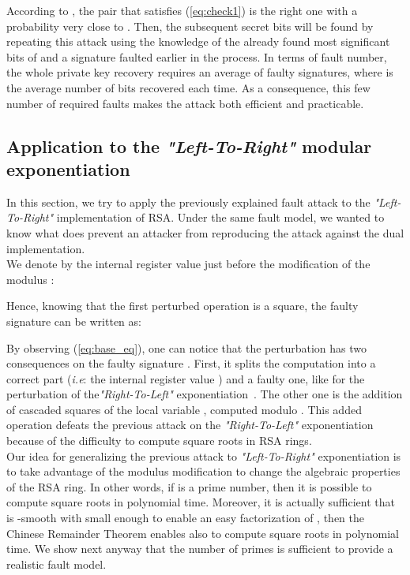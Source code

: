 \documentclass{article}
\begin{document}
According to \cite{77}, the pair  that satisfies (\ref{eq:check1}) is the right one with a probability very close to . Then, the subsequent secret bits will be found by repeating this attack using the knowledge of the already found most significant bits of  and a signature faulted earlier in the process. In terms of fault number, the whole private key recovery requires an average of  faulty signatures, where  is the average number of bits recovered each time. As a consequence, this few number of required faults makes the attack both efficient and practicable.

\subsection{Application to the \textit{"Left-To-Right"} modular exponentiation}
\label{sec:l2r_mod_exp}
In this section, we try to apply the previously explained fault attack to the \textit{"Left-To-Right"} implementation of RSA. Under the same fault model, we wanted to know what does prevent an attacker from reproducing the attack against the dual implementation.\\
\indent 
We denote by  the internal register value just before the modification of the modulus :

Hence, knowing that the first perturbed operation is a square, the faulty signature  can be written as:


By observing (\ref{eq:base_eq}), one can notice that the perturbation
has two consequences on the faulty signature . First, it
splits the computation into a correct part (\textit{i.e}: the internal
register value ) and a faulty one, like for the perturbation of
the\textit{"Right-To-Left"} exponentiation~\cite{77}. The other one is
the addition of  cascaded squares of the local variable ,
computed modulo . This added operation defeats the previous
attack on the \textit{"Right-To-Left"} exponentiation~\cite{77}
because of the difficulty to compute square roots in RSA rings.\\
\indent
Our idea for generalizing the previous attack to
\textit{"Left-To-Right"} exponentiation is to take advantage of the
modulus modification to change the algebraic properties of the RSA
ring. In other words, if  is a prime number, then it
is possible to compute square roots in polynomial time.
Moreover, it is actually 
sufficient that  is -smooth with  small enough to enable
an easy factorization of , then the Chinese Remainder Theorem
enables also to compute square roots in polynomial time.
We show next anyway that the number of primes  is sufficient to
provide a realistic fault model.
\end{document}
